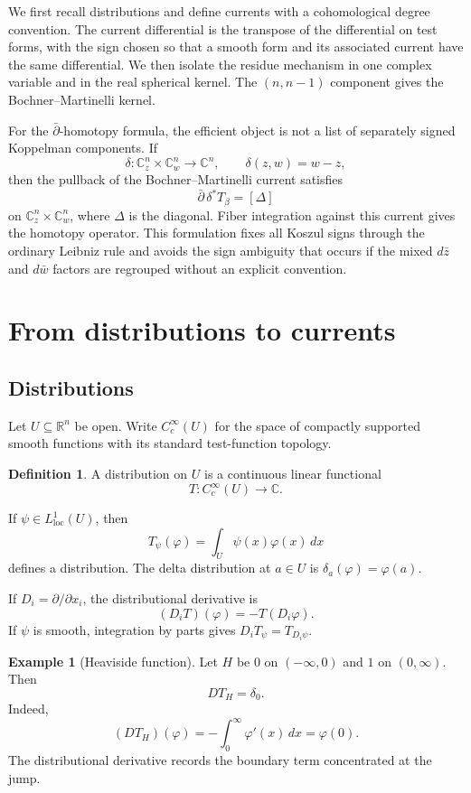 \documentclass[11pt,a4paper]{article}
\theoremstyle{definition}
\newtheorem{definition}[theorem]{Definition}
\newtheorem{example}[theorem]{Example}
\theoremstyle{remark}
\newcommand{\C}{\mathbb C}
\newcommand{\R}{\mathbb R}
\newcommand{\ddbar}{\bar\partial}
\begin{document}
We first recall distributions and define currents with a cohomological degree convention. The current differential is the transpose of the differential on test forms, with the sign chosen so that a smooth form and its associated current have the same differential. We then isolate the residue mechanism in one complex variable and in the real spherical kernel. The $(n,n-1)$ component gives the Bochner--Martinelli kernel.

For the $\bar\partial$-homotopy formula, the efficient object is not a list of separately signed Koppelman components. If
\[
\delta:\C_z^n\times\C_w^n\longrightarrow\C^n,\qquad \delta(z,w)=w-z,
\]
then the pullback of the Bochner--Martinelli current satisfies
\[
\ddbar\,\delta^*T_\beta=[\Delta]
\]
on $\C_z^n\times\C_w^n$, where $\Delta$ is the diagonal. Fiber integration against this current gives the homotopy operator. This formulation fixes all Koszul signs through the ordinary Leibniz rule and avoids the sign ambiguity that occurs if the mixed $d\bar z$ and $d\bar w$ factors are regrouped without an explicit convention.

\section{From distributions to currents}

\subsection{Distributions}

Let $U\subseteq\R^n$ be open. Write $C_c^\infty(U)$ for the space of compactly supported smooth functions with its standard test-function topology.

\begin{definition}
A distribution on $U$ is a continuous linear functional
\[
T:C_c^\infty(U)\longrightarrow\C.
\]
\end{definition}

If $\psi\in L^1_{\mathrm{loc}}(U)$, then
\[
T_\psi(\varphi)=\int_U \psi(x)\varphi(x)\,dx
\]
defines a distribution. The delta distribution at $a\in U$ is $\delta_a(\varphi)=\varphi(a)$.

If $D_i=\partial/\partial x_i$, the distributional derivative is
\[
(D_iT)(\varphi)=-T(D_i\varphi).
\]
If $\psi$ is smooth, integration by parts gives $D_iT_\psi=T_{D_i\psi}$.

\begin{example}[Heaviside function]
Let $H$ be $0$ on $(-\infty,0)$ and $1$ on $(0,\infty)$. Then
\[
D T_H=\delta_0.
\]
Indeed,
\[
(DT_H)(\varphi)=-\int_0^\infty \varphi'(x)\,dx=\varphi(0).
\]
The distributional derivative records the boundary term concentrated at the jump.
\end{example}
\end{document}
